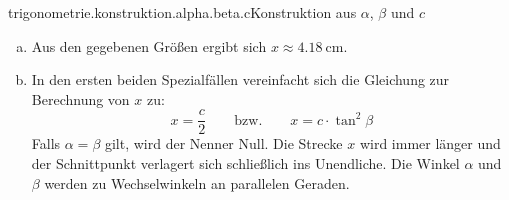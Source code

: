 \begin{exercise}{trigonometrie.konstruktion.alpha.beta.c}{Konstruktion aus $\alpha$, $\beta$ und $c$}
\begin{enumerate}[a)]
            den gegebenen Größen berechnen:
            \begin{equation*}
              x=c\cdot\frac{\sin^{2}\beta}{\sin(\alpha+\beta)\cdot\sin(\alpha-\beta)}
            \end{equation*}
      \item Aus den gegebenen Größen ergibt sich $x\approx\SI{4.18}{\centi\metre}$.
      \item In den ersten beiden Spezialfällen vereinfacht sich die Gleichung
            zur Berechnung von $x$ zu:
            \begin{equation*}
              x=\frac{c}{2}\qquad\text{bzw.}\qquad x=c\cdot\tan^{2}\beta
            \end{equation*}
            Falls $\alpha=\beta$ gilt, wird der Nenner Null. Die Strecke $x$
            wird immer länger und der Schnittpunkt verlagert sich schließlich
            ins Unendliche. Die Winkel $\alpha$ und $\beta$ werden zu
            Wechselwinkeln an parallelen Geraden.
    \end{enumerate}
  \fi
\end{exercise}
